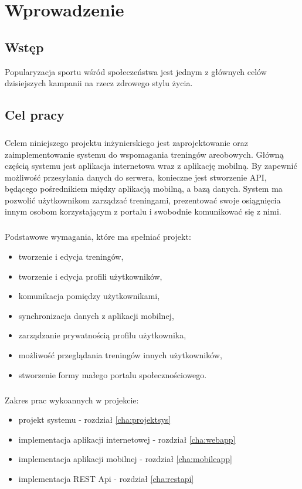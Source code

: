 \chapter{Wprowadzenie}

\section{Wstęp} %
\label{sec:wst_p}
Popularyzacja sportu wśród społeczeństwa jest jednym z głównych celów dzisiejszych kampanii na rzecz zdrowego stylu życia. 

\section{Cel pracy}
\label{sec:cel_pracy}
\paragraph{}
Celem niniejszego projektu inżynierskiego jest zaprojektowanie oraz zaimplementowanie systemu do wspomagania treningów areobowych. Główną częścią systemu jest aplikacja internetowa wraz z aplikację mobilną. By zapewnić możliwość przesyłania danych do serwera, konieczne jest stworzenie API, będącego pośrednikiem między aplikacją mobilną, a bazą danych.
System ma pozwolić użytkownikom zarządzać treningami, prezentować swoje osiągnięcia innym osobom korzystającym z portalu i swobodnie komunikować się z nimi.
\paragraph{} %
\label{par:}
Podstawowe wymagania, które ma spełniać projekt:
\begin{itemize}
	\item tworzenie i edycja treningów,
	\item tworzenie i edycja profili użytkowników,
	\item komunikacja pomiędzy użytkownikami,
	\item synchronizacja danych z aplikacji mobilnej,
	\item zarządzanie prywatnością profilu użytkownika,
	\item możliwość przeglądania treningów innych użytkowników,
	\item stworzenie formy małego portalu społecznościowego.
\end{itemize}

\paragraph{} %
\label{par:}
Zakres prac wykoannych w projekcie:
\begin{itemize}
  \item projekt systemu - rozdział \ref{cha:projektsys}
	\item implementacja aplikacji internetowej - rozdział \ref{cha:webapp}
	\item implementacja aplikacji mobilnej - rozdział \ref{cha:mobileapp}
	\item implementacja REST Api - rozdział \ref{cha:restapi}
\end{itemize}

